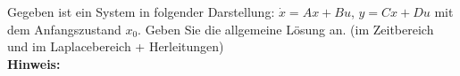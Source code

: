 \begin{question}[section=3,name={Anfangszustand},difficulty=5,type=mdl,tags={}]
	Gegeben ist ein System in folgender Darstellung: $\dot{x} = Ax + Bu$, $y = Cx + Du$ mit dem Anfangszustand $x_0$. Geben Sie die allgemeine Lösung an. (im Zeitbereich und im Laplacebereich + Herleitungen)
	\\ \textbf{Hinweis:}\\
	
\end{question}
\begin{solution}
	
\end{solution}